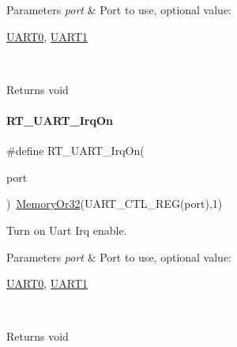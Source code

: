 \begin{DoxyParams}{Parameters}
{\em port} & Port to use, optional value\+:
\begin{DoxyCode}
\mbox{\hyperlink{a00098_a0508661f121639ffdee7de2353a0def2}{UART0}}, \mbox{\hyperlink{a00098_a8d69bf04d07af4fbbab5a8bd291f65ff}{UART1}}
\end{DoxyCode}
 \\
\hline
\end{DoxyParams}
\begin{DoxyReturn}{Returns}
void 
\end{DoxyReturn}
\mbox{\label{a00098_a5ed058b5d506df45c51358b8451550ad}} 
\paragraph{\texorpdfstring{R\+T\+\_\+\+U\+A\+R\+T\+\_\+\+Irq\+On}{RT\_UART\_IrqOn}}
{\footnotesize\ttfamily \#define R\+T\+\_\+\+U\+A\+R\+T\+\_\+\+Irq\+On(\begin{DoxyParamCaption}\item[{}]{port }\end{DoxyParamCaption})~\mbox{\hyperlink{a00026_a27874a97deab7cecdde5ddecf466e31e}{Memory\+Or32}}(U\+A\+R\+T\+\_\+\+C\+T\+L\+\_\+\+R\+EG(port),1)}



Turn on Uart Irq enable. 


\begin{DoxyParams}{Parameters}
{\em port} & Port to use, optional value\+:
\begin{DoxyCode}
\mbox{\hyperlink{a00098_a0508661f121639ffdee7de2353a0def2}{UART0}}, \mbox{\hyperlink{a00098_a8d69bf04d07af4fbbab5a8bd291f65ff}{UART1}}
\end{DoxyCode}
 \\
\hline
\end{DoxyParams}
\begin{DoxyReturn}{Returns}
void 
\end{DoxyReturn}
\mbox{\label{a00098_a9e7d98206f07485a3347bab6672a971c}} 

